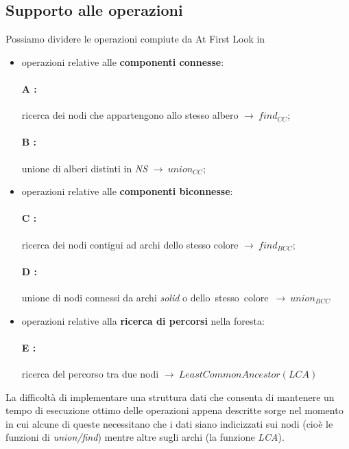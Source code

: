 \documentclass[a4paper,11pt]{report}
\begin{document}
\subsection{Supporto alle operazioni}
Possiamo dividere le operazioni compiute da At First Look in
\begin{itemize}
 \item operazioni relative alle \textbf{componenti connesse}:
\paragraph{A : } ricerca dei nodi che appartengono allo stesso albero $\rightarrow\ find_{CC}$;
\paragraph{B :} unione di alberi distinti in \emph{NS} $\rightarrow\ union_{CC}$; 
 \item operazioni relative alle \textbf{componenti biconnesse}:
\paragraph{C :} ricerca dei nodi contigui ad archi dello stesso colore $\rightarrow\ find_{BCC}$;
\paragraph{D :} unione di nodi connessi da archi \emph{solid} o \mbox{dello stesso colore $\rightarrow\ union_{BCC}$ }
 \item operazioni relative alla \textbf{ricerca di percorsi} nella foresta:
\paragraph{E :} ricerca del percorso tra due nodi $\rightarrow\ Least Common Ancestor (LCA)$
\end{itemize}
 
La difficoltà di implementare una struttura dati che consenta di mantenere un tempo di esecuzione ottimo delle operazioni
appena descritte sorge nel momento in cui alcune di queste necessitano che i dati siano indicizzati sui nodi (cioè le funzioni
di \emph{union/find}) mentre altre sugli archi (la funzione \emph{LCA}).  
\end{document}

